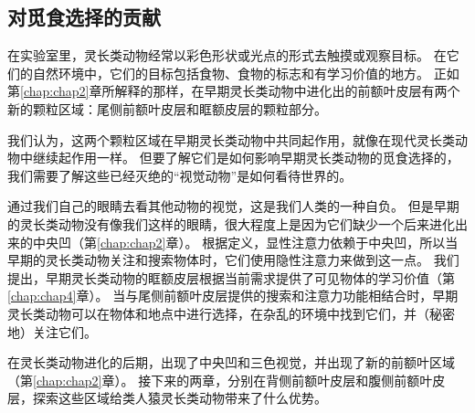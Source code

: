 \subsection{对觅食选择的贡献}

在实验室里，灵长类动物经常以彩色形状或光点的形式去触摸或观察目标。
在它们的自然环境中，它们的目标包括食物、食物的标志和有学习价值的地方。
正如第\ref{chap:chap2}章所解释的那样，在早期灵长类动物中进化出的前额叶皮层有两个新的颗粒区域：尾侧前额叶皮层和眶额皮层的颗粒部分。


我们认为，这两个颗粒区域在早期灵长类动物中共同起作用，就像在现代灵长类动物中继续起作用一样。
但要了解它们是如何影响早期灵长类动物的觅食选择的，我们需要了解这些已经灭绝的“视觉动物”是如何看待世界的。


通过我们自己的眼睛去看其他动物的视觉，这是我们人类的一种自负。
但是早期的灵长类动物没有像我们这样的眼睛，很大程度上是因为它们缺少一个后来进化出来的中央凹（第\ref{chap:chap2}章）。
根据定义，显性注意力依赖于中央凹，所以当早期的灵长类动物关注和搜索物体时，它们使用隐性注意力来做到这一点。
我们提出，早期灵长类动物的眶额皮层根据当前需求提供了可见物体的学习价值（第\ref{chap:chap4}章）。
当与尾侧前额叶皮层提供的搜索和注意力功能相结合时，早期灵长类动物可以在物体和地点中进行选择，在杂乱的环境中找到它们，并（秘密地）关注它们。


在灵长类动物进化的后期，出现了中央凹和三色视觉，并出现了新的前额叶区域（第\ref{chap:chap2}章）。
接下来的两章，分别在背侧前额叶皮层和腹侧前额叶皮层，探索这些区域给类人猿灵长类动物带来了什么优势。


